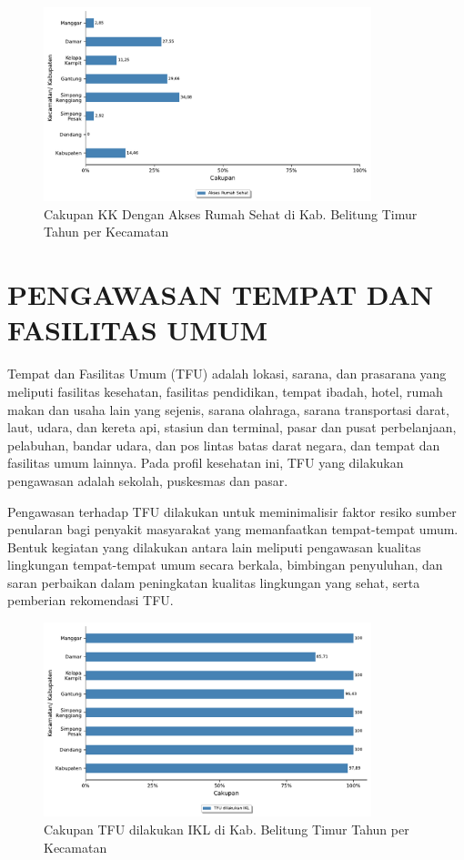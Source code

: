 \begin{figure}[H]
	\centering
	\includegraphics[width=0.85\textwidth]{bab_07/bab_07_03b_aksesRumahSehat}
	\caption{Cakupan KK Dengan Akses Rumah Sehat di Kab. Belitung Timur Tahun \tP per Kecamatan}
	\label{fig:Cakupan-KK-Rumah-Sehat}
\end{figure}

\section{PENGAWASAN TEMPAT DAN FASILITAS UMUM}
Tempat dan Fasilitas Umum (TFU) adalah lokasi, sarana, dan prasarana yang meliputi fasilitas kesehatan, fasilitas pendidikan, tempat ibadah, hotel, rumah makan dan usaha lain yang sejenis, sarana olahraga, sarana transportasi darat, laut, udara, dan kereta api, stasiun dan terminal, pasar dan pusat perbelanjaan, pelabuhan, bandar udara, dan pos lintas batas darat negara, dan tempat dan fasilitas umum lainnya. Pada profil kesehatan ini, TFU yang dilakukan pengawasan adalah sekolah, puskesmas dan pasar.

Pengawasan terhadap TFU dilakukan untuk meminimalisir faktor resiko sumber penularan bagi penyakit masyarakat yang memanfaatkan tempat-tempat umum.
Bentuk kegiatan yang dilakukan antara lain meliputi pengawasan kualitas lingkungan tempat-tempat umum secara berkala, bimbingan penyuluhan, dan saran perbaikan dalam peningkatan kualitas lingkungan yang sehat, serta pemberian rekomendasi TFU.

\begin{figure}[H]
	\centering
    \includegraphics[width=0.85\textwidth]{bab_07/bab_07_04_TFUIKL}
	\caption{Cakupan TFU dilakukan IKL di Kab. Belitung Timur Tahun \tP per Kecamatan}
	\label{fig:Cakupan-TFU-IKL}
\end{figure}

